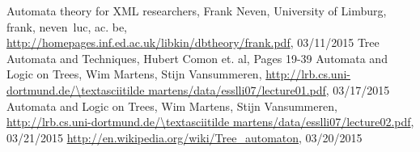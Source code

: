 \documentclass{llncs}
\begin{document}
\pagebreak

%
%
\begin{thebibliography}{99}
%
	Automata theory for XML researchers,
	Frank Neven,
	University of Limburg,
	frank, neven~luc, ac. be,
	\url{http://homepages.inf.ed.ac.uk/libkin/dbtheory/frank.pdf}, 03/11/2015
	Tree Automata and Techniques, Hubert Comon et. al, Pages 19-39
	Automata and Logic on Trees,
	Wim Martens,
	Stijn Vansummeren,
	\url{http://lrb.cs.uni-dortmund.de/\textasciitilde martens/data/esslli07/lecture01.pdf}, 03/17/2015
	Automata and Logic on Trees,
	Wim Martens,
	Stijn Vansummeren,
	\url{http://lrb.cs.uni-dortmund.de/\textasciitilde martens/data/esslli07/lecture02.pdf}, 03/21/2015
	\url{http://en.wikipedia.org/wiki/Tree\_automaton}, 03/20/2015




\end{thebibliography}
\end{document}

